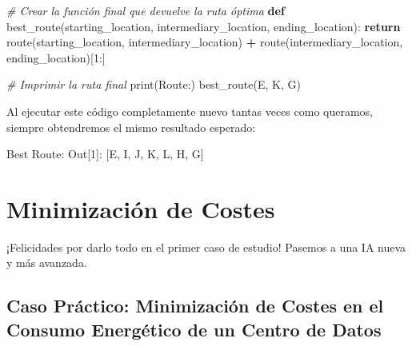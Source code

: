 \documentclass[
]{book}
\newenvironment{Shaded}{\begin{snugshade}}{\end{snugshade}}
\newcommand{\BuiltInTok}[1]{#1}
\newcommand{\CommentTok}[1]{\textcolor[rgb]{0.56,0.35,0.01}{\textit{#1}}}
\newcommand{\ControlFlowTok}[1]{\textcolor[rgb]{0.13,0.29,0.53}{\textbf{#1}}}
\newcommand{\DecValTok}[1]{\textcolor[rgb]{0.00,0.00,0.81}{#1}}
\newcommand{\KeywordTok}[1]{\textcolor[rgb]{0.13,0.29,0.53}{\textbf{#1}}}
\newcommand{\NormalTok}[1]{#1}
\newcommand{\OperatorTok}[1]{\textcolor[rgb]{0.81,0.36,0.00}{\textbf{#1}}}
\newcommand{\StringTok}[1]{\textcolor[rgb]{0.31,0.60,0.02}{#1}}
\begin{document}
\begin{Shaded}
\begin{Highlighting}[]
\CommentTok{\# Crear la función final que devuelve la ruta óptima}
\KeywordTok{def}\NormalTok{ best\_route(starting\_location, intermediary\_location, ending\_location):}
    \ControlFlowTok{return}\NormalTok{ route(starting\_location, intermediary\_location)}
           \OperatorTok{+}\NormalTok{ route(intermediary\_location, ending\_location)[}\DecValTok{1}\NormalTok{:]}

\CommentTok{\# Imprimir la ruta final}
\BuiltInTok{print}\NormalTok{(}\StringTok{\textquotesingle{}Route:\textquotesingle{}}\NormalTok{)}
\NormalTok{best\_route(}\StringTok{\textquotesingle{}E\textquotesingle{}}\NormalTok{, }\StringTok{\textquotesingle{}K\textquotesingle{}}\NormalTok{, }\StringTok{\textquotesingle{}G\textquotesingle{}}\NormalTok{)}
\end{Highlighting}
\end{Shaded}

Al ejecutar este código completamente nuevo tantas veces como queramos, siempre obtendremos el mismo resultado esperado:

\begin{Shaded}
\begin{Highlighting}[]
\NormalTok{Best Route:}
\NormalTok{Out[}\DecValTok{1}\NormalTok{]: [}\StringTok{\textquotesingle{}E\textquotesingle{}}\NormalTok{, }\StringTok{\textquotesingle{}I\textquotesingle{}}\NormalTok{, }\StringTok{\textquotesingle{}J\textquotesingle{}}\NormalTok{, }\StringTok{\textquotesingle{}K\textquotesingle{}}\NormalTok{, }\StringTok{\textquotesingle{}L\textquotesingle{}}\NormalTok{, }\StringTok{\textquotesingle{}H\textquotesingle{}}\NormalTok{, }\StringTok{\textquotesingle{}G\textquotesingle{}}\NormalTok{]}
\end{Highlighting}
\end{Shaded}

\hypertarget{minimizaciuxf3n-de-costes}{%
\chapter{Minimización de Costes}\label{minimizaciuxf3n-de-costes}}

¡Felicidades por darlo todo en el primer caso de estudio! Pasemos a una IA nueva y más avanzada.

\hypertarget{caso-pruxe1ctico-minimizaciuxf3n-de-costes-en-el-consumo-energuxe9tico-de-un-centro-de-datos}{%
\section{Caso Práctico: Minimización de Costes en el Consumo Energético de un Centro de Datos}\label{caso-pruxe1ctico-minimizaciuxf3n-de-costes-en-el-consumo-energuxe9tico-de-un-centro-de-datos}}
\end{document}
